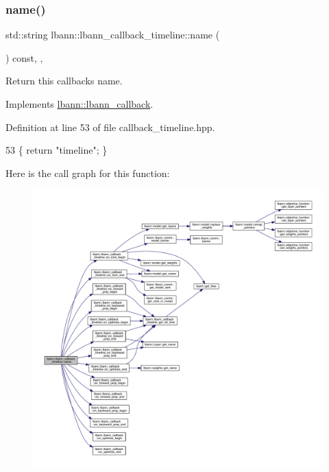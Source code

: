 \subsubsection{\texorpdfstring{name()}{name()}}
{\footnotesize\ttfamily std\+::string lbann\+::lbann\+\_\+callback\+\_\+timeline\+::name (\begin{DoxyParamCaption}{ }\end{DoxyParamCaption}) const\hspace{0.3cm}{\ttfamily [inline]}, {\ttfamily [override]}, {\ttfamily [virtual]}}

Return this callback\textquotesingle{}s name. 

Implements \hyperlink{classlbann_1_1lbann__callback_a7522c7a14f1d6a1ea762cc2d7248eb3a}{lbann\+::lbann\+\_\+callback}.



Definition at line 53 of file callback\+\_\+timeline.\+hpp.


\begin{DoxyCode}
53 \{ \textcolor{keywordflow}{return} \textcolor{stringliteral}{"timeline"}; \}
\end{DoxyCode}
Here is the call graph for this function\+:\nopagebreak
\begin{figure}[H]
\begin{center}
\leavevmode
\includegraphics[width=350pt]{classlbann_1_1lbann__callback__timeline_aaede0408ae30a3c82f567981e374a224_cgraph}
\end{center}
\end{figure}
\mbox{\label{classlbann_1_1lbann__callback__timeline_a81d50e48462765b5e9913ae357b5a412}} 
